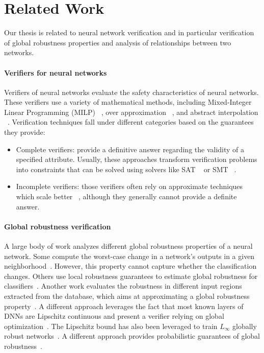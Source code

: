 
\section{Related Work}
Our thesis is related to neural network verification and in particular verification of global robustness properties and analysis of relationships between two networks.

\paragraph{Verifiers for neural networks}\label{subsec:verifiers}
Verifiers of neural networks evaluate the safety characteristics of neural networks. These verifiers use a variety of mathematical methods, including Mixed-Integer Linear Programming (MILP) ~\cite{singh2018robustness,lazarus2022mixed}, over approximation ~\cite{qin2019verification}, and abstract interpolation ~\cite{ABSTRACTINTER,INCOMPLETE1}. Verification techniques fall under different categories based on the guarantees they provide:
\begin{itemize}[nosep,nolistsep]
    \item  Complete verifiers: provide a definitive answer regarding the validity of a specified attribute. Usually, these approaches transform verification problems into constraints that can be solved using solvers like SAT ~\cite{SATAPPROACH1,SATAPPROACH2} or SMT ~\cite{NNTOBINARCONSTRAINS,PLANET,Reluplex}. %
    \item Incomplete verifiers: those verifiers often rely on approximate techniques which scale better ~\cite{INCOMPLETE1,INCOMPLETE2}, although they generally cannot provide a definite answer. 
\end{itemize}

\paragraph{Global robustness verification}
A large body of work analyzes different global robustness properties of a neural network.
Some compute the worst-case change in a network's outputs in a given neighborhood~\cite{Reluplex,EFCIENTGLOBALROBU}. However, this property cannot capture whether the classification changes. Others use local robustness guarantees to estimate global robustness for classifiers~\cite{MEASURENNROBCON,GLOBALPROPERTY}. Another work evaluates the robustness in different input regions extracted from the database, which aims at approximating a global robustness property~\cite{ROBUSTFROMDATASET}. A different approach leverages the fact that most known layers of DNNs are Lipschitz continuous and present a verifier relying on global optimization~\cite{ANOTHERGLOBALPROPERTY}. The Lipschitz bound has also been leveraged to train \( L_\infty \) globally robust networks~\cite{RETHINKLIP}. A different approach  provides probabilistic guarantees of global robustness~\cite{GROMA}.

